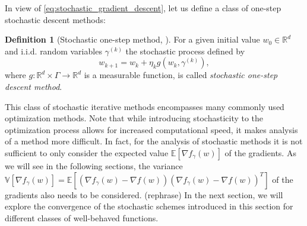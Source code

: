 \documentclass[12pt]{article}
\theoremstyle{definition}
\newtheorem{definition}[definition]{Definition}
\numberwithin{equation}{section}
\begin{document}
In view of \eqref{eq:stochastic_gradient_descent}, let us define a class of one-step stochastic descent methods:
\begin{definition}[Stochastic one-step method, ]
  For a given initial value $w_{0} \in \mathbb{R}^d$ and i.i.d. random variables $\gamma^{(k)}$ the stochastic process defined by
\begin{equation}
  w_{k+1} = w_{k} + \eta_k g(w_{k}, \gamma^{(k)}),
\end{equation}
  where $g:\mathbb{R}^d \times \Gamma \rightarrow \mathbb{R}^d$ is a measurable function, is called \emph{stochastic one-step descent method}.
\end{definition}
This class of stochastic iterative methods encompasses many commonly used optimization methods. Note that while introducing stochasticity to the optimization process allows for increased computational speed, it makes analysis of a method more difficult. In fact, for the analysis of stochastic methods it is not sufficient to only consider the expected value $\mathbb{E}[\nabla f_{\gamma}(w)]$ of the gradients. As we will see in the following sections, the variance $\mathbb{V}[\nabla f_{\gamma}(w)] = \mathbb{E}[(\nabla f_{\gamma}(w) - \nabla f(w)){(\nabla f_{\gamma}(w) - \nabla f(w))}^T]$ of the gradients also needs to be considered. (rephrase)
In the next section, we will explore the convergence of the stochastic schemes introduced in this section for different classes of well-behaved functions.
\end{document}
